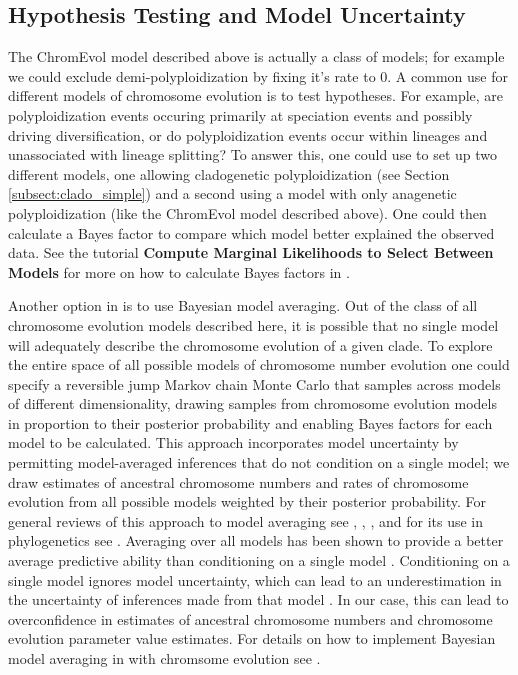 \subsection{Hypothesis Testing and Model Uncertainty}

The ChromEvol model described above is actually a class of models;
for example we could exclude demi-polyploidization by fixing it's rate to 0.
A common use for different models of chromosome evolution is to test hypotheses.
For example, are polyploidization events
occuring primarily at speciation events and possibly driving diversification,
or do polyploidization events occur within lineages and unassociated with lineage splitting?
To answer this, one could use \RevBayes to set up two different models, one allowing cladogenetic
polyploidization (see Section \ref{subsect:clado_simple}) and a second
using a model with only anagenetic polyploidization (like the ChromEvol model described above).
One could then calculate a Bayes factor to compare which model better explained the observed data.
See the \RevBayes tutorial \textbf{Compute Marginal Likelihoods to Select Between Models}
for more on how to calculate Bayes factors in \RevBayes.


Another option in \RevBayes is to use Bayesian model averaging.
Out of the class of all chromosome evolution models
described here, it is possible that no single model
will adequately describe the chromosome evolution
of a given clade.
To explore the entire space of all possible models of chromosome number evolution 
one could specify a reversible jump Markov chain Monte Carlo \citep{green1995reversible} that samples across models of different dimensionality,
drawing samples
from chromosome evolution models in proportion to their posterior probability and
enabling Bayes factors for each model to be calculated.
This approach incorporates model uncertainty
by permitting model-averaged inferences that do not condition on a single model;
we draw estimates of ancestral chromosome numbers and rates of chromosome evolution
from all possible models weighted by their posterior probability.
For general reviews of this approach to model averaging see
\cite{madigan1994model}, \cite{hoeting1999bayesian}, \cite{kass1995bayes},
and for its use in phylogenetics see \citet{posada2004model}.
Averaging over all models has been shown to
provide a better average predictive ability
than conditioning on a single model
\citep{madigan1994model}.
Conditioning on a single model ignores model uncertainty,
which can lead to an underestimation in the uncertainty
of inferences made from that model \citep{hoeting1999bayesian}.
In our case, this can lead to overconfidence in estimates
of ancestral chromosome numbers and chromosome
evolution parameter value estimates.
For details on how to implement Bayesian model averaging in \RevBayes
with chromsome evolution see \citet{freyman2016cladogenetic}.



